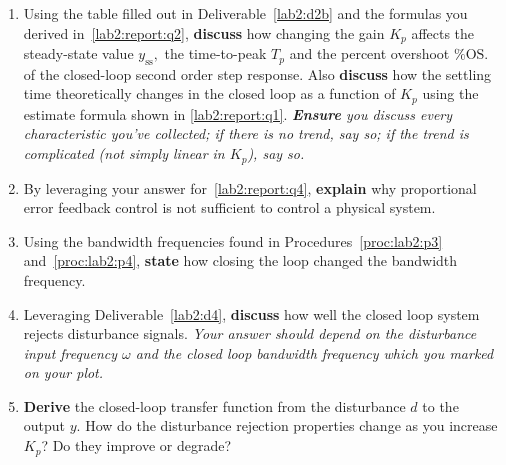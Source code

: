 \begin{deliverable}[label={lab2:report}]
\begin{enumerate}[label={(\arabic*)}]
    \item{
      Using the table filled out in Deliverable~\ref{lab2:d2b} and the
      formulas you derived in~\ref{lab2:report:q2},
      \textbf{discuss} how changing the
      gain \(K_p\) affects the steady-state value \(y_\mathrm{ss},\) the
      time-to-peak \(T_p\) and the percent overshoot \(\%\mathrm{OS}.\)
      of the closed-loop second order step response.
      Also \textbf{discuss} how the settling time theoretically changes in the
      closed loop as a function of \(K_p\) using the estimate formula shown in
      \ref{lab2:report:q1}.
      \emph{\textbf{Ensure} you discuss every characteristic
      you've collected; if there is no trend, say so; if the trend is
      complicated (not simply linear in \(K_p\)), say so.}
      \label{lab2:report:q4}
    }
    \item{
      By leveraging your answer for~\ref{lab2:report:q4}, \textbf{explain} why
      proportional error feedback control is not sufficient to control a
      physical system.
      \label{lab2:report:q4b}
    }
    \item{
      Using the bandwidth frequencies found in Procedures~\ref{proc:lab2:p3}
      and~\ref{proc:lab2:p4}, \textbf{state} how closing the loop
      changed the bandwidth frequency.
      \label{lab2:report:q5}
    }
    \item{
      Leveraging Deliverable~\ref{lab2:d4}, \textbf{discuss} how well the
      closed loop system rejects disturbance signals.
      \emph{Your answer should depend on the disturbance input frequency
      \(\omega\) and the closed loop bandwidth frequency which you marked
      on your plot.}
      \label{lab2:report:q6}
    }
    \item{
      \textbf{Derive} the closed-loop transfer function from the
      disturbance \(d\) to the output \(y.\) How do the disturbance rejection
      properties change as you increase \(K_p\)? Do they improve or degrade?
}
\end{enumerate}
\end{deliverable}
